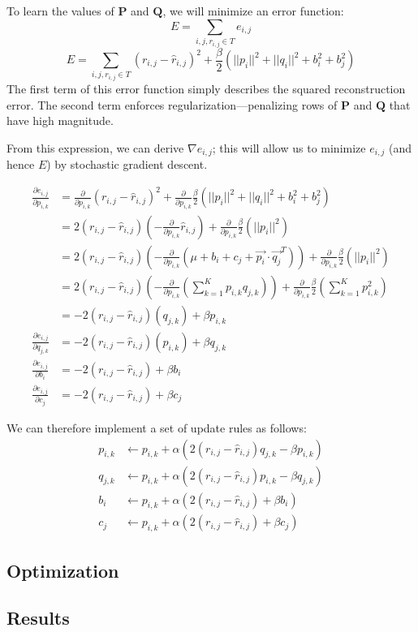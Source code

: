 \documentclass[11pt]{amsart}
\newcommand{\mat}[1]{\mathbf{#1}}
\begin{document}
To learn the values of $\mat{P}$ and $\mat{Q}$, we will minimize an error function:
$$E = \sum_{i,j,r_{i,j} \in T} e_{i,j} $$
$$E = \sum_{i,j,r_{i,j} \in T} \left(r_{i,j} - \hat{r}_{i,j}\right)^2 + \frac{\beta}{2} \left( ||p_i||^2 + ||q_i||^2 + b_i^2 + b_j^2 \right) $$
The first term of this error function simply describes the squared reconstruction error. The second term enforces regularization---penalizing rows of $\mat{P}$ and $\mat{Q}$ that have high magnitude. 

From this expression, we can derive $\nabla e_{i,j}$; this will allow us to minimize $e_{i,j}$ (and hence $E$) by stochastic gradient descent.

\begin{align*}
\frac{\partial e_{i,j}}{\partial p_{i,k}} &= \frac{\partial}{\partial p_{i,k}} \left(r_{i,j} - \hat{r}_{i,j}\right)^2 + \frac{\partial}{\partial p_{i,k}} \frac{\beta}{2} \left( ||p_i||^2 + ||q_i||^2 + b_i^2 + b_j^2 \right) \\
    &= 2 \left(r_{i,j} - \hat{r}_{i,j}\right)  \left(-\frac{\partial}{\partial p_{i,k}} \hat{r}_{i,j}\right)  + \frac{\partial}{\partial p_{i,k}} \frac{\beta}{2} \left( ||p_i||^2\right) \\
    &= 2 \left(r_{i,j} - \hat{r}_{i,j}\right)  \left(-\frac{\partial}{\partial p_{i,k}} \left(\mu + b_i + c_j + \vec{p_i} \cdot \vec{q_j}^T \right) \right)  + \frac{\partial}{\partial p_{i,k}} \frac{\beta}{2} \left( ||p_i||^2 \right) \\
    &= 2 \left(r_{i,j} - \hat{r}_{i,j}\right)  \left(-\frac{\partial}{\partial p_{i,k}} \left( \sum_{k=1}^{K} p_{i,k} q_{j,k} \right) \right)  + \frac{\partial}{\partial p_{i,k}} \frac{\beta}{2} \left( \sum_{k=1}^{K} p_{i,k}^2 \right) \\
    &= -2 \left(r_{i,j} - \hat{r}_{i,j}\right)  \left(q_{j,k} \right) + \beta p_{i,k} \\
\frac{\partial e_{i,j}}{\partial q_{j,k}} &= -2 \left(r_{i,j} - \hat{r}_{i,j}\right)  \left(p_{i,k} \right) + \beta q_{j,k} \\
\frac{\partial e_{i,j}}{\partial b_{i}} &= -2 \left(r_{i,j} - \hat{r}_{i,j}\right) + \beta b_{i} \\
\frac{\partial e_{i,j}}{\partial c_{j}} &= -2 \left(r_{i,j} - \hat{r}_{i,j}\right) + \beta c_{j}
\end{align*}

We can therefore implement a set of update rules as follows:
\begin{align*}
p_{i,k} &\gets p_{i,k} + \alpha \left(2 \left(r_{i,j} - \hat{r}_{i,j}\right)  q_{j,k} - \beta p_{i,k} \right) \\
q_{j,k} &\gets p_{i,k} + \alpha \left(2 \left(r_{i,j} - \hat{r}_{i,j}\right)  p_{i,k} - \beta q_{j,k} \right) \\
b_{i}   &\gets p_{i,k} + \alpha \left(2 \left(r_{i,j} - \hat{r}_{i,j}\right)          + \beta b_{i}   \right) \\
c_{j}   &\gets p_{i,k} + \alpha \left(2 \left(r_{i,j} - \hat{r}_{i,j}\right)          + \beta c_{j}   \right)
\end{align*}

\subsection{Optimization}

\subsection{Results}
\end{document}
